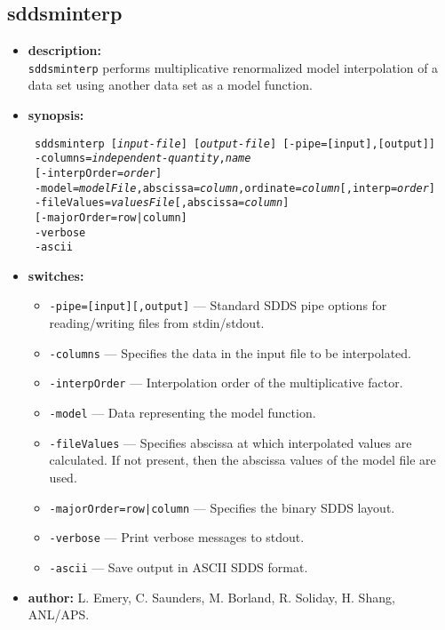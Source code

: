 \newpage 
\subsection{sddsminterp} 
\label{sddsminterp} 
 
\begin{itemize} 
\item {\bf description:} \hspace*{1mm}\\ 
{\tt sddsminterp} performs multiplicative renormalized model interpolation of a data set using another data set as a model function.
\item {\bf synopsis:}  
\begin{flushleft}
{\tt 
sddsminterp [{\em input-file}] [{\em output-file}] [-pipe=[input],[output]] \\ \
-columns={\em independent-quantity},{\em name} \\ \
{}[-interpOrder={\em order}] \\ \
-model={\em modelFile},abscissa={\em column},ordinate={\em column}[,interp={\em order}] \\ \
-fileValues={\em valuesFile}[,abscissa={\em column}] \\ \
{}[-majorOrder=row|column] \\ \
-verbose \\ \
-ascii}
\end{flushleft} 
\item {\bf switches:} 
    \begin{itemize} 
    \item {\tt -pipe=[input][,output]} --- Standard SDDS pipe options for reading/writing files from stdin/stdout.
    \item {\tt -columns} --- Specifies the data in the input file to be interpolated.
    \item {\tt -interpOrder} --- Interpolation order of the multiplicative factor.
    \item {\tt -model} --- Data representing the model function.
    \item {\tt -fileValues} --- Specifies abscissa at which interpolated values are calculated. If not present, then the abscissa values of the model file are used.
    \item {\tt -majorOrder=row|column} --- Specifies the binary SDDS layout.
    \item {\tt -verbose} --- Print verbose messages to stdout.
    \item {\tt -ascii} --- Save output in ASCII SDDS format.
\end{itemize} 

\item {\bf author:} L. Emery, C. Saunders, M. Borland, R. Soliday, H. Shang, ANL/APS. 
\end{itemize} 
